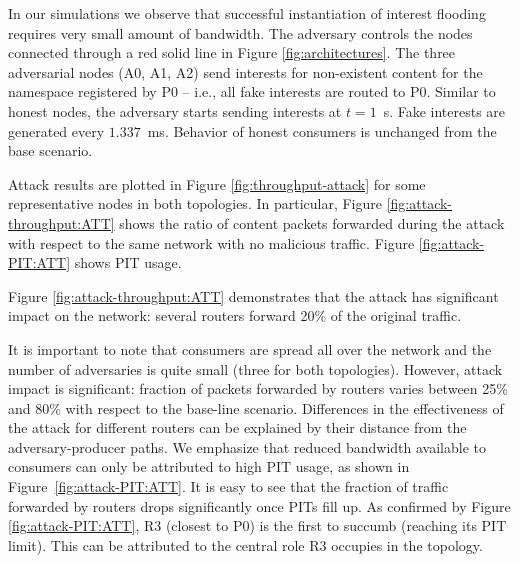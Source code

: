 \documentclass[10pt,conference,letterpaper]{IEEEtran}
\begin{document}
In our simulations we observe that successful instantiation of interest flooding requires very small 
amount of  bandwidth.
The adversary controls the nodes connected through a red solid line in Figure 
\ref{fig:architectures}.
The three adversarial nodes (A0, A1, A2) send interests for non-existent content for the 
namespace registered by P0 -- i.e., all fake interests are routed to P0. Similar to 
honest nodes, the adversary starts sending interests at $t=1$~s. Fake interests are 
generated every $1.337$~ms. Behavior of honest consumers is unchanged from the base scenario.

Attack results are plotted in Figure \ref{fig:throughput-attack} for some representative 
nodes in both topologies. In particular, 
Figure \ref{fig:attack-throughput:ATT} shows the ratio of content packets forwarded during 
the attack with respect to the same network with no malicious traffic. 
Figure \ref{fig:attack-PIT:ATT} shows PIT usage.



\begin{figure*}[htp!]
 \centering
{}
\hspace{-3mm}
 \caption{Interest Flooding Attack (IFA): impact over baseline}
\label{fig:throughput-attack}
 \end{figure*}





Figure \ref{fig:attack-throughput:ATT} demonstrates that the attack has significant impact on the network:  
several routers forward 20\% of the original traffic. 




It is important to note that 
consumers are spread all 
over the network and the number of adversaries is quite small (three for both topologies). However, 
attack impact is significant: fraction of packets forwarded by routers varies between 25\% and 80\% 
with respect to the base-line scenario. Differences in the effectiveness of the attack for different routers  
can be explained by their distance from the adversary-producer paths.
We emphasize that reduced bandwidth available to consumers can only be attributed 
to high PIT usage, as shown in 
Figure~\ref{fig:attack-PIT:ATT}.
It is easy to see that the fraction of traffic forwarded by routers drops significantly 
once PITs fill up.
As confirmed by Figure \ref{fig:attack-PIT:ATT}, R3 (closest to P0) is the first to succumb (reaching its PIT limit). This can be attributed to the central role R3 occupies in the topology.
\end{document}
